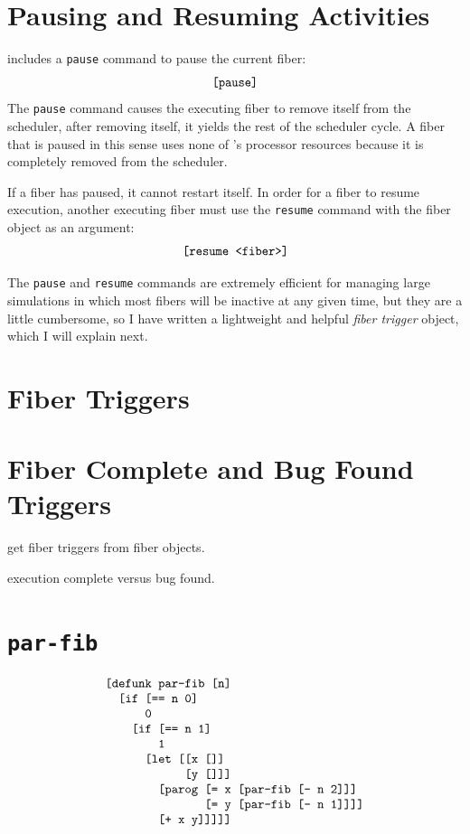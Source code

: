 \section{Pausing and Resuming Activities}

{\SALS} includes a {\tt pause} command to pause the current fiber:
\begin{equation*}
\text{\tt [pause]}
\end{equation*}
The {\tt pause} command causes the executing fiber to remove itself
from the scheduler, after removing itself, it yields the rest of the
scheduler cycle.  A fiber that is paused in this sense uses none of
{\SALS}'s processor resources because it is completely removed from
the scheduler.

If a fiber has paused, it cannot restart itself.  In order for a fiber
to resume execution, another executing fiber must use the
{\tt resume} command with the fiber object as an argument:
\begin{equation*}
\text{\tt [resume <fiber>]}
\end{equation*}

The {\tt pause} and {\tt resume} commands are extremely efficient for
managing large simulations in which most fibers will be inactive at
any given time, but they are a little cumbersome, so I have written a
lightweight and helpful \emph{fiber trigger} object, which I will
explain next.

\section{Fiber Triggers}

\section{Fiber Complete and Bug Found Triggers}

get fiber triggers from fiber objects.

execution complete versus bug found.


\section{{\tt par-fib}}

\begin{equation*}
\begin{array}{l}
\text{\tt [defunk par-fib [n]} \\
\text{\tt ~~[if [== n 0]} \\
\text{\tt ~~~~~~0} \\
\text{\tt ~~~~[if [== n 1]} \\
\text{\tt ~~~~~~~~1} \\
\text{\tt ~~~~~~[let [[x []]} \\
\text{\tt ~~~~~~~~~~~~[y []]]} \\
\text{\tt ~~~~~~~~[parog [= x [par-fib [- n 2]]]} \\
\text{\tt ~~~~~~~~~~~~~~~[= y [par-fib [- n 1]]]]} \\
\text{\tt ~~~~~~~~[+ x y]]]]]}
\end{array}
\end{equation*}


